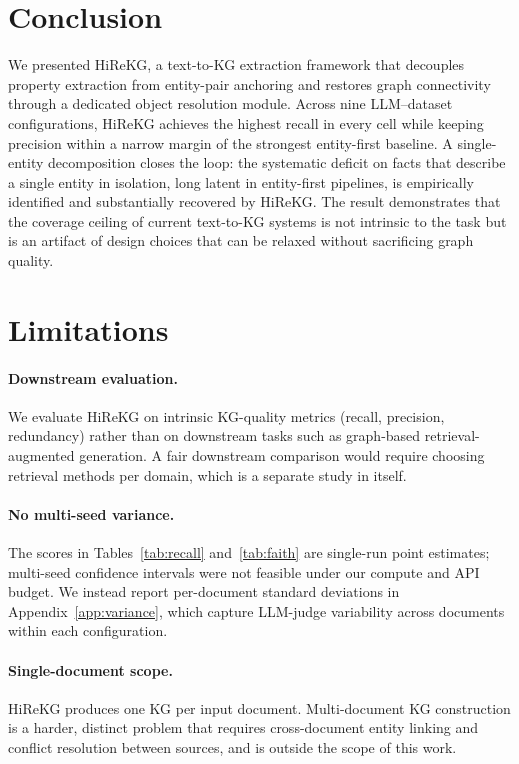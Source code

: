 \documentclass[11pt]{article}
\begin{document}
\section{Conclusion}
\label{sec:conclusion}
We presented HiReKG, a text-to-KG extraction framework that decouples property extraction from entity-pair anchoring and restores graph connectivity through a dedicated object resolution module. Across nine LLM--dataset configurations, HiReKG achieves the highest recall in every cell while keeping precision within a narrow margin of the strongest entity-first baseline. A single-entity decomposition closes the loop: the systematic deficit on facts that describe a single entity in isolation, long latent in entity-first pipelines, is empirically identified and substantially recovered by HiReKG. The result demonstrates that the coverage ceiling of current text-to-KG systems is not intrinsic to the task but is an artifact of design choices that can be relaxed without sacrificing graph quality.



\section{Limitations}

\paragraph{Downstream evaluation.} We evaluate HiReKG on intrinsic KG-quality metrics (recall, precision, redundancy) rather than on downstream tasks such as graph-based retrieval-augmented generation. A fair downstream comparison would require choosing retrieval methods per domain, which is a separate study in itself.

\paragraph{No multi-seed variance.} The scores in Tables~\ref{tab:recall} and~\ref{tab:faith} are single-run point estimates; multi-seed confidence intervals were not feasible under our compute and API budget. We instead report per-document standard deviations in Appendix~\ref{app:variance}, which capture LLM-judge variability across documents within each configuration.

\paragraph{Single-document scope.} HiReKG produces one KG per input document. Multi-document KG construction is a harder, distinct problem that requires cross-document entity linking and conflict resolution between sources, and is outside the scope of this work.
\end{document}
